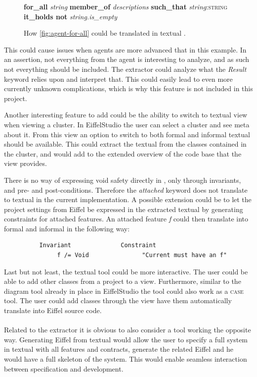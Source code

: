 \begin{figure}[h]
\centerline{
\footnotesize{\textbf{for\_all} \textit{string} \textbf{member\_of} \textit{descriptions} \textbf{such\_that} \textit{string}:\textsc{string} \textbf{it\_holds not} \textit{string.is\_empty}}
}
\caption{How \ref{fig:agent-for-all} could be translated in textual \bon.}
\label{fig:bon-for-all}
\end{figure}
This could cause issues when agents are more advanced that in this example. In an assertion, not everything from the agent is interesting to analyze, and as such not everything should be included. The extractor could analyze what the \textit{Result} keyword relies upon and interpret that. This could easily lead to even more currently unknown complications, which is why this feature is not included in this project.

Another interesting feature to add could be the ability to switch to textual \bon{} view when viewing a cluster. In EiffelStudio the user can select a cluster and see meta about it. From this view an option to switch to both formal and informal textual \bon{} should be available. This could extract the textual \bon{} from the classes contained in the cluster, and would add to the extended overview of the code base that the \bon{} view provides.

There is no way of expressing void safety directly in \bon, only through invariants, and pre- and post-conditions. Therefore the \textit{attached} keyword does not translate to textual \bon{} in the current implementation. A possible extension could be to let the project settings from Eiffel be expressed in the extracted textual \bon{} by generating constraints for attached features. An attached feature \textit{f} could then translate into formal and informal \bon{} in the following way:
\footnotesize
\begin{verbatim}
          Invariant              Constraint
               f /= Void               "Current must have an f"
\end{verbatim}

\normalsize Last but not least, the textual \bon{} tool could be more interactive. The user could be able to add other classes from a project to a \bon{} view. Furthermore, similar to the diagram tool already in place in EiffelStudio the \bon{} tool could also work as a \textsc{case} tool. The user could add classes through the \bon{} view have them automatically translate into Eiffel source code.

\paragraph{}
Related to the \bon{} extractor it is obvious to also consider a tool working the opposite way. Generating Eiffel from textual \bon{} would allow the user to specify a full system in textual \bon{} with all features and contracts, generate the related Eiffel and he would have a full skeleton of the system. This would enable seamless interaction between specification and development.

